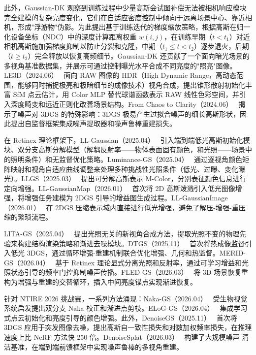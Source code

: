 此外，Gaussian-DK 观察到训练过程中少量高斯会试图补偿无法被相机响应模块完全建模的复杂亮度变化，它们在自适应密度控制中倾向于远离场景中心、靠近相机，形成"浮游物"伪影。为此提出基于训练迭代的梯度缩放策略，根据高斯在归一化设备坐标（NDC）中的深度计算距离权重 $w(i,j)$，在训练早期（$t < t_1$）对近相机高斯施加强梯度抑制以防止分裂和克隆，中期（$t_1 \leq t < t_2$）逐步退火，后期（$t \geq t_2$）完全释放以恢复高频细节。Gaussian-DK 还贡献了一个面向暗光场景的多视角基准数据集，并展示可通过控制曝光水平合成不同亮度的"照亮"图像。LE3D（2024.06）~\cite{2406_06216} 面向 RAW 图像的 HDR（High Dynamic Range，高动态范围，能够同时捕捉极亮和极暗细节的成像技术）视角合成，提出锥形散射初始化丰富 SfM 点云估计，用 Color MLP 替代球谐函数表示 RAW 线性色彩空间，并引入深度畸变和远近正则化改善场景结构。From Chaos to Clarity（2024.06）~\cite{2406_08300} 揭示了噪声对 3DGS 的特殊影响：3DGS 极易产生过拟合噪声的细长高斯形状，因此提出自监督框架集成噪声提取器和噪声鲁棒重建损失。

在 Retinex 理论框架下，LL-Gaussian（2025.04）~\cite{2504_10331} 引入端到端低光高斯初始化模块、双分支高斯分解模型（解耦反射率——物体表面固有颜色，和光照——场景中的照明条件）和无监督优化策略。Luminance-GS（2025.04）~\cite{2504_01503} 通过逐视角颜色矩阵映射和视角自适应曲线调整来处理多种挑战性光照条件（低光、过曝、变化曝光）。LLGS（2025.03）~\cite{2503_18640} 提出可分解高斯表示 M-Color，分别表征颜色信息进行定向增强。LL-GaussianMap（2026.01）~\cite{2601_15766} 首次将 2D 高斯泼溅引入低光图像增强，将增强任务建模为 2DGS 引导的增益图生成过程。LL-GaussianImage（2026.01）~\cite{2601_15772} 在 2DGS 压缩表示域内直接进行低光增强，避免了解压-增强-重压缩的繁琐流程。

LITA-GS（2025.04）~\cite{2504_00219} 提出光照无关的新视角合成方法，提取光照不变的物理先验来构建结构渲染策略和渐进去噪模块。DTGS（2025.11）~\cite{2511_13011} 首次将热成像监督引入低光 3DGS，通过循环增强-重建机制联合优化增强、几何和热监督。MERID-GS（2026.04）~\cite{2604_24053} 基于 Retinex 理论显式分离光照和反射率，通过可学习增益和光照状态引导的频率门控抑制噪声传播。FLED-GS（2026.03）~\cite{2603_08133} 将 3D 场景恢复重构为增强与重建的交替循环，插入中间亮度锚点实现渐进恢复。

针对 NTIRE 2026 挑战赛，一系列方法涌现：Naka-GS（2026.04）~\cite{2604_11142} 受生物视觉系统启发提出双分支 Naka 校正和渐进点剪枝。ELoG-GS（2026.04）~\cite{2604_12592} 集成学习式点云初始化和亮度引导的颜色增强。此外，DenoiseGS（2025.11）~\cite{2511_22939} 首次将 3DGS 应用于突发图像去噪，提出高斯自一致性损失和对数加权频率损失，在推理速度上比 NeRF 方法快 250 倍。DenoiseSplat（2026.03）~\cite{2603_09291} 构建了大规模噪声-清洁基准，在端到端前馈框架中实现噪声鲁棒的多视角重建。

